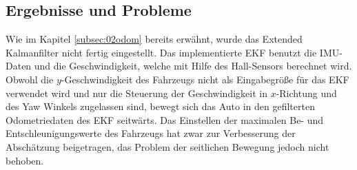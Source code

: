 \subsection{Ergebnisse und Probleme}
\label{subsec:02ergebnisse}
Wie im Kapitel \ref{subsec:02odom} bereits erw\"ahnt, wurde das Extended Kalmanfilter nicht fertig eingestellt. Das implementierte EKF benutzt die IMU-Daten und die Geschwindigkeit, welche mit Hilfe des Hall-Sensors berechnet wird. Obwohl die $y$-Geschwindigkeit des Fahrzeugs nicht als Eingabegr\"o{\ss}e f\"ur das EKF verwendet wird und nur die Steuerung der Geschwindigkeit in $x$-Richtung und des Yaw Winkels zugelassen sind, bewegt sich das Auto in den gefilterten Odometriedaten des EKF seitw\"arts. Das Einstellen der maximalen Be- und Entschleunigungswerte des Fahrzeugs hat zwar zur Verbesserung der Absch\"atzung beigetragen, das Problem der seitlichen Bewegung jedoch nicht behoben.